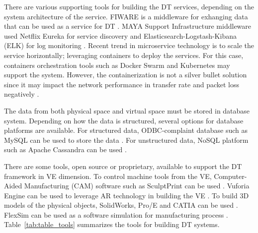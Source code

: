 \documentclass[article,table]{aaltoseries}
\begin{document}
There are various supporting tools for building the DT services, depending on the system architecture of the service. FIWARE is a middleware for exhanging data that can be used as a service for DT \cite{Schroeder2016automationml}. MAYA Support Infrastructure middleware used Netflix Eureka for service discovery and Elasticsearch-Logstash-Kibana (ELK) for log monitoring \cite{ciavotta2017microservice}. Recent trend in microservice technology is to scale the service horizontally; leveraging containers to deploy the services. For this case, containers orchestration tools such as Docker Swarm and Kubernetes may support the system. However, the containerization is not a silver bullet solution since it may impact the network performance in transfer rate and packet loss negatively \cite{kratzke2017microservices}.

The data from both physical space and virtual space must be stored in database system. Depending on how the data is structured, several options for database platforms are available. For structured data, ODBC-complaint database such as MySQL can be used to store the data \cite{Zhang2017}. For unstructured data, NoSQL platform such as Apache Cassandra can be used \cite{ciavotta2017microservice}.

There are some tools, open source or proprietary, available to support the DT framework in VE dimension. To control machine tools from the VE, Computer-Aided Manufacturing (CAM) software such as SculptPrint can be used \cite{lynn2018realization}. Vuforia Engine can be used to leverage AR technology in building the VE \cite{schroeder2016visualising}. To build 3D models of the physical objects, SolidWorks, Pro/E and CATIA can be used \cite{Zhuang2018}. FlexSim can be used as a software simulation for manufacturing process \cite{Zhang2017}. Table~\ref{tab:table_tools} summarizes the tools for building DT systems.
\end{document}
